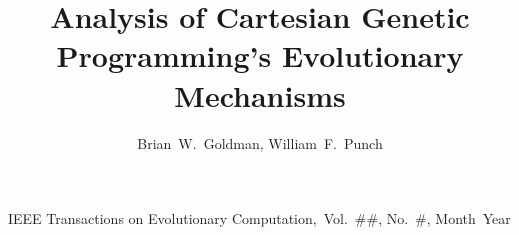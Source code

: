 \documentclass[journal]{IEEEtran}
\begin{document}
%
\title{Analysis of Cartesian Genetic Programming's Evolutionary Mechanisms}
%
%
%

\author{Brian~W.~Goldman, William~F.~Punch}

% 
%



%
{IEEE Transactions on Evolutionary Computation,~Vol.~\#\#, No.~\#, Month~Year}
% 
\end{document}
